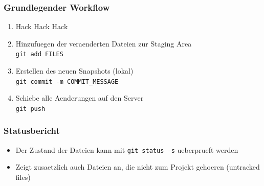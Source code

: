 \documentclass[12pt,utf8]{beamer}
\begin{document}
	\begin{frame}
		\frametitle{Grundlegender Workflow}
		\begin{enumerate}
			\item Hack Hack Hack
			\item Hinzufuegen der veraenderten Dateien zur Staging Area\\
				\texttt{git add FILES}
			\item Erstellen des neuen Snapshots (lokal)\\
				\texttt{git commit -m COMMIT\_MESSAGE}
			\item Schiebe alle Aenderungen auf den Server\\
				\texttt{git push}
		\end{enumerate}
	\end{frame}

	\begin{frame}
	\frametitle{Statusbericht}
		\begin{itemize}
			\item Der Zustand der Dateien kann mit \texttt{git status -s} ueberprueft werden\\
			\item Zeigt zusaetzlich auch Dateien an, die nicht zum Projekt gehoeren (untracked files)
		\end{itemize}
	\end{frame}
	
	
	\begin{frame}
		
		
	\end{frame}
	
\end{document}
